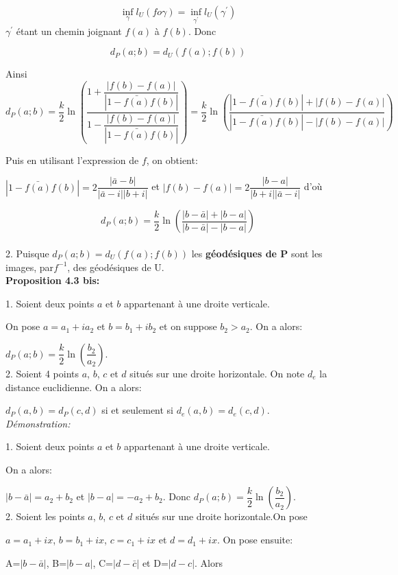 \documentclass[a4paper, 12pt, twoside]{book}
\begin{document}
$$\inf_{\gamma}l_{U}(fo\gamma)=\inf_{\gamma^{'}}l_{U}(\gamma^{'})$$ $\gamma^{'}$ étant un chemin joignant $f(a)$ à $f(b)$. Donc

$$d_{P}(a; b)=d_{U}(f(a); f(b))$$

Ainsi $$d_{P}(a; b)=\dfrac{k}{2}\ln(\dfrac{1+\dfrac{|f(b)-f(a)|}{|1-\bar{f(a)}f(b)|}}{1-\dfrac{|f(b)-f(a)|}{|1-\bar{f(a)}f(b)|}})=\dfrac{k}{2}\ln(\dfrac{|1-\bar{f(a)}f(b)|+|f(b)-f(a)|}{|1-\bar{f(a)}f(b)|-|f(b)-f(a)|})$$


Puis en utilisant l'expression de $f$, on obtient:

$|1-\bar{f(a)}f(b)|=2\dfrac{|\bar{a}-b|}{|\bar{a}-i||b+i|}$ et $|f(b)-f(a)|=2\dfrac{|b-a|}{|b+i||\bar{a}-i|}$ d'où

$$d_{P}(a; b)= \dfrac{k}{2}\ln(\dfrac{|b-\bar{a}|+|b-a|}{|b-\bar{a}|-|b-a|})$$\\


2. Puisque $d_{P}(a; b)=d_{U}(f(a); f(b))$ les \textbf{géodésiques de P}  sont les images, par$f^{-1}$, des géodésiques de U.\\

\newpage \textbf{Proposition 4.3 bis:}\

1. Soient deux points $a$ et $b$ appartenant à une droite verticale.\

On pose $a=a_{1}+ia_{2}$ et $b=b_{1}+ib_{2}$ et on suppose $b_{2}>a_{2}$. On a alors:\
  
  
  $d_{P}(a;b)=\dfrac{k}{2}\ln(\dfrac{b_{2}}{a_{2}})$.\\

2. Soient 4 points $a$, $b$, $c$ et $d$ situés sur une droite horizontale. On note $d_{e}$ la distance euclidienne. On a alors:

$d_{P}(a,b)=d_{P}(c,d)$ si et seulement si $d_{e}(a,b)=d_{e}(c,d)$.\\

\textit{Démonstration:}


1. Soient deux points $a$ et $b$ appartenant à une droite verticale.\

 On a alors:\

$|b-\bar{a}|=a_{2}+b_{2}$ et  $|b-a|=-a_{2}+b_{2}$.  Donc $d_{P}(a;b)=\dfrac{k}{2}\ln(\dfrac{b_{2}}{a_{2}})$.\\

2. Soient les points $a$, $b$, $c$ et $d$ situés sur une droite horizontale.On pose\

$a=a_{1}+ix$, $b=b_{1}+ix$, $c=c_{1}+ix$ et $d=d_{1}+ix$. On pose ensuite:\

A=$|b-\bar{a}|$, B=$|b-a|$, C=$|d-\bar{c}|$ et D=$|d-c|$. Alors\
\end{document}

